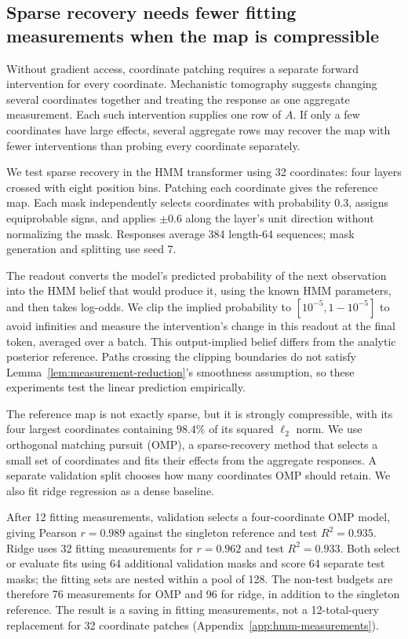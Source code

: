 \documentclass[sigconf,10pt,nonacm,balance=false]{acmart}
\begin{document}
\subsection{Sparse recovery needs fewer fitting measurements when the map is compressible}\label{sec:aggregate}

Without gradient access, coordinate patching requires a separate forward intervention for every coordinate. Mechanistic tomography suggests changing several coordinates together and treating the response as one aggregate measurement. Each such intervention supplies one row of $A$. If only a few coordinates have large effects, several aggregate rows may recover the map with fewer interventions than probing every coordinate separately.

We test sparse recovery in the HMM transformer using 32 coordinates: four layers crossed with eight position bins. Patching each coordinate gives the reference map. Each mask independently selects coordinates with probability $0.3$, assigns equiprobable signs, and applies $\pm0.6$ along the layer's unit direction without normalizing the mask. Responses average 384 length-64 sequences; mask generation and splitting use seed 7.

The readout converts the model's predicted probability of the next observation into the HMM belief that would produce it, using the known HMM parameters, and then takes log-odds. We clip the implied probability to $[10^{-5},1-10^{-5}]$ to avoid infinities and measure the intervention's change in this readout at the final token, averaged over a batch. This output-implied belief differs from the analytic posterior reference. Paths crossing the clipping boundaries do not satisfy Lemma~\ref{lem:measurement-reduction}'s smoothness assumption, so these experiments test the linear prediction empirically.

The reference map is not exactly sparse, but it is strongly compressible, with its four largest coordinates containing $98.4\%$ of its squared $\ell_2$ norm. We use orthogonal matching pursuit (OMP), a sparse-recovery method that selects a small set of coordinates and fits their effects from the aggregate responses. A separate validation split chooses how many coordinates OMP should retain. We also fit ridge regression as a dense baseline.

After 12 fitting measurements, validation selects a four-coordinate OMP model, giving Pearson $r=0.989$ against the singleton reference and test $R^2=0.935$. Ridge uses 32 fitting measurements for $r=0.962$ and test $R^2=0.933$. Both select or evaluate fits using 64 additional validation masks and score 64 separate test masks; the fitting sets are nested within a pool of 128. The non-test budgets are therefore 76 measurements for OMP and 96 for ridge, in addition to the singleton reference. The result is a saving in fitting measurements, not a 12-total-query replacement for 32 coordinate patches (Appendix~\ref{app:hmm-measurements}).
\end{document}
